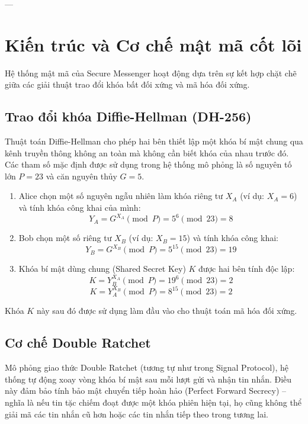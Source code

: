 \documentclass[12pt,a4paper]{article}
\begin{document}
---

\section{Kiến trúc và Cơ chế mật mã cốt lõi}
Hệ thống mật mã của Secure Messenger hoạt động dựa trên sự kết hợp chặt chẽ giữa các giải thuật trao đổi khóa bất đối xứng và mã hóa đối xứng.

\subsection{Trao đổi khóa Diffie-Hellman (DH-256)}
Thuật toán Diffie-Hellman cho phép hai bên thiết lập một khóa bí mật chung qua kênh truyền thông không an toàn mà không cần biết khóa của nhau trước đó.
Các tham số mặc định được sử dụng trong hệ thống mô phỏng là số nguyên tố lớn $P = 23$ và căn nguyên thủy $G = 5$.
\begin{enumerate}
    \item Alice chọn một số nguyên ngẫu nhiên làm khóa riêng tư $X_A$ (ví dụ: $X_A = 6$) và tính khóa công khai của mình:
    \begin{equation}
        Y_A = G^{X_A} \pmod P = 5^6 \pmod{23} = 8
    \end{equation}
    \item Bob chọn một số riêng tư $X_B$ (ví dụ: $X_B = 15$) và tính khóa công khai:
    \begin{equation}
        Y_B = G^{X_B} \pmod P = 5^{15} \pmod{23} = 19
    \end{equation}
    \item Khóa bí mật dùng chung (Shared Secret Key) $K$ được hai bên tính độc lập:
    \begin{equation}
        K = Y_B^{X_A} \pmod P = 19^6 \pmod{23} = 2
    \end{equation}
    \begin{equation}
        K = Y_A^{X_B} \pmod P = 8^{15} \pmod{23} = 2
    \end{equation}
\end{enumerate}
Khóa $K$ này sau đó được sử dụng làm đầu vào cho thuật toán mã hóa đối xứng.

\subsection{Cơ chế Double Ratchet}
Mô phỏng giao thức Double Ratchet (tương tự như trong Signal Protocol), hệ thống tự động xoay vòng khóa bí mật sau mỗi lượt gửi và nhận tin nhắn. Điều này đảm bảo tính bảo mật chuyển tiếp hoàn hảo (Perfect Forward Secrecy) -- nghĩa là nếu tin tặc chiếm đoạt được một khóa phiên hiện tại, họ cũng không thể giải mã các tin nhắn cũ hơn hoặc các tin nhắn tiếp theo trong tương lai.
\end{document}
